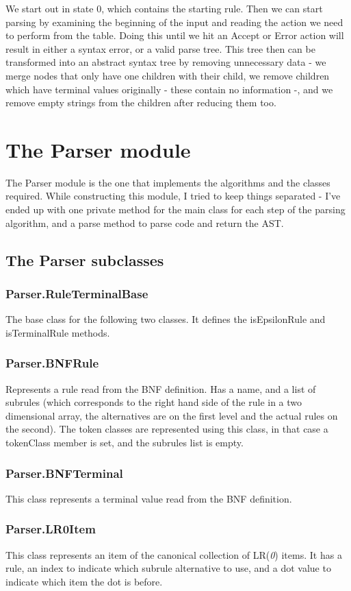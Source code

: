 We start out in state 0, which contains the starting rule. Then we can start parsing by examining the beginning of the input and reading the action we need to perform from the table. Doing this until we hit an Accept or Error action will result in either a syntax error, or a valid parse tree. This tree then can be transformed into an abstract syntax tree by removing unnecessary data - we merge nodes that only have one children with their child, we remove children which have terminal values originally - these contain no information -, and we remove empty strings from the children after reducing them too.
\section{The Parser module}
The Parser module is the one that implements the algorithms and the classes required. While constructing this module, I tried to keep things separated - I've ended up with one private method for the main class for each step of the parsing algorithm, and a parse method to parse code and return the AST.
\subsection{The Parser subclasses}
\subsubsection{Parser.RuleTerminalBase}
The base class for the following two classes. It defines the isEpsilonRule and isTerminalRule methods.
\subsubsection{Parser.BNFRule}
Represents a rule read from the BNF definition. Has a name, and a list of subrules (which corresponds to the right hand side of the rule in a two dimensional array, the alternatives are on the first level and the actual rules on the second). The token classes are represented using this class, in that case a tokenClass member is set, and the subrules list is empty.
\subsubsection{Parser.BNFTerminal}
This class represents a terminal value read from the BNF definition.
\subsubsection{Parser.LR0Item}
This class represents an item of the canonical collection of LR(\textit{0}) items. It has a rule, an index to indicate which subrule alternative to use, and a dot value to indicate which item the dot is before.

